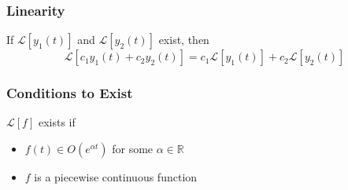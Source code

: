 \documentclass{report}
\begin{document}
\subsubsection{Linearity}
If $\mathcal{L}[y_1(t)]$ and $\mathcal{L}[y_2(t)]$ exist, then
$$\mathcal{L}[c_1y_1(t) + c_2y_2(t)] = c_1 \mathcal{L}[y_1(t)] + c_2 \mathcal{L}[y_2(t)]$$
\subsubsection{Conditions to Exist}
$\mathcal{L}[f]$ exists if
\begin{itemize}
\item $f(t) \in O(e^{\alpha t})$ for some $\alpha \in \mathbb{R}$
\item $f$ is a piecewise continuous function
\end{itemize}
\end{document}

